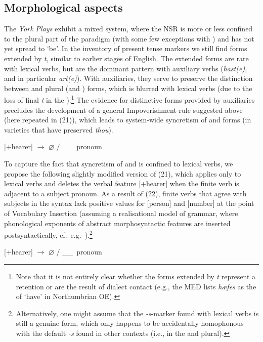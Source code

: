\documentclass[output=paper]{langsci/langscibook}
\begin{document}
\subsection{Morphological aspects}
The \emph{York Plays} exhibit a mixed system, where the \gls{NSR} is more or less confined to the plural part of the paradigm (with
some few exceptions with \Fsg{}) and has not yet spread to `be'. In the
inventory of present tense markers we still find \Ssg{} forms extended by
\emph{t}, similar to earlier stages of English. The extended forms are rare
with lexical verbs, but are the dominant pattern with auxiliary
verbs (\emph{hast(e)}, and in particular \emph{art(e)}). With auxiliaries, they
serve to preserve the distinction between \Ssg{} and plural (and \Tsg{}) forms,
which is blurred with lexical verbs (due to the loss of final \emph{t} in the
\Ssg{}).\footnote{Note that it is not entirely clear whether the \Ssg{} forms
extended by \emph{t} represent a retention or are the result of dialect contact
(e.g., the MED lists \emph{hæfes} as the \Ssg{} of `have' in Northumbrian
\gls{OE}).} The evidence for distinctive \Ssg{} forms provided by auxiliaries
precludes the development of a general Impoverishment rule
suggested above (here repeated in (21)), which leads to system-wide syncretism
of \Ssg{} and \Tsg{} forms (in varieties that have preserved \emph{thou}).

\ea
\mbox{[+hearer]} {$\rightarrow$ $\varnothing$} / \_\_\ pronoun\tief{[NOM]}
\z

To capture the fact that syncretism of \Ssg{} and \Tsg{} is confined to lexical
verbs, we propose the following slightly modified version of (21), which
applies only to lexical verbs and deletes the verbal  feature
[+hearer] when the finite verb is adjacent to a \Ssg{} subject pronoun. As a
result of (22), finite verbs that agree with \Ssg{} subjects in the syntax lack
positive values for [person] and [number] at the point of Vocabulary Insertion
(assuming a realisational model of grammar, where phonological exponents of
abstract morphosyntactic features are inserted postsyntactically, cf.\ e.g.\
\citealt{HalleMarantz1993}).\footnote{Alternatively, one might assume that the
\emph{-s}-marker found with \Ssg{} lexical verbs is still a genuine \Ssg{}
form, which only happens to be accidentally homophonous with the default
\emph{-s} found in other contexts (i.e., in the \Tsg{} and plural).}

\ea
\mbox{[+hearer]} {$\rightarrow$ $\varnothing$} / \_\_\ pronoun\tief{[NOM]}
\z
\end{document}

